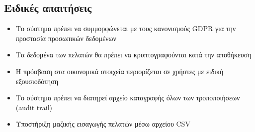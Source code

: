 \documentclass[12pt,a4paper,twoside]{book}
\begin{document}
\begin{enumerate}
\end{enumerate}

\subsection{Ειδικές απαιτήσεις} %
\begin{itemize}
  \item Το σύστημα πρέπει να συμμορφώνεται με τους κανονισμούς GDPR για την προστασία προσωπικών δεδομένων %
  \item Τα δεδομένα των πελατών θα πρέπει να κρυπτογραφούνται κατά την αποθήκευση %
  \item Η πρόσβαση στα οικονομικά στοιχεία περιορίζεται σε χρήστες με ειδική εξουσιοδότηση %
  \item Το σύστημα πρέπει να διατηρεί αρχείο καταγραφής όλων των τροποποιήσεων (audit trail) %
  \item Υποστήριξη μαζικής εισαγωγής πελατών μέσω αρχείου CSV
\end{itemize}
\end{document}
